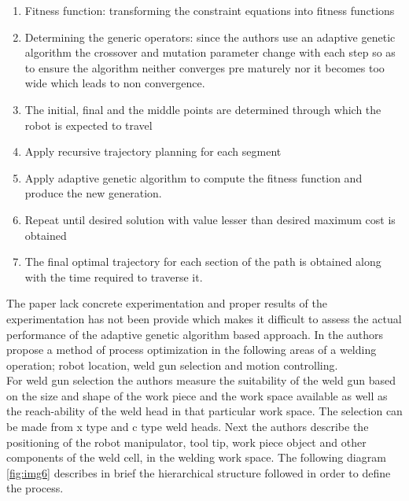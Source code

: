 \begin{enumerate}
\item Fitness function: transforming the constraint equations into fitness functions
\item Determining the generic operators: since the authors use an adaptive genetic algorithm the crossover and mutation parameter change with each step so as to ensure the algorithm neither converges pre maturely nor it becomes too wide which leads to non convergence.
\item The initial, final and the middle points are determined through which the robot is expected to travel
\item Apply recursive trajectory planning for each segment
\item Apply adaptive genetic algorithm to compute the fitness function and produce the new generation.
\item Repeat until desired solution with value lesser than desired maximum cost is obtained
\item The final optimal trajectory for each section of the path is obtained along with the time required to traverse it.
\end{enumerate} 
The paper lack concrete experimentation and proper results of the experimentation has not been provide which makes it difficult to assess the actual performance of the adaptive genetic algorithm based approach. 
In \citet{QiuZhu2011} the authors propose a method of process optimization in the following areas of a welding operation; robot location, weld gun selection and motion controlling.   \\         
For weld gun selection the authors measure the suitability of the weld gun based on the size and shape of the work piece and the work space available as well as the reach-ability of the weld head in that particular work space. The selection can be made from x type and c type weld heads. Next the authors describe the positioning of the robot manipulator, tool tip, work piece object and other components of the weld cell, in the welding work space. The following diagram \ref{fig:img6} describes in brief the hierarchical structure followed in order to define the process.
